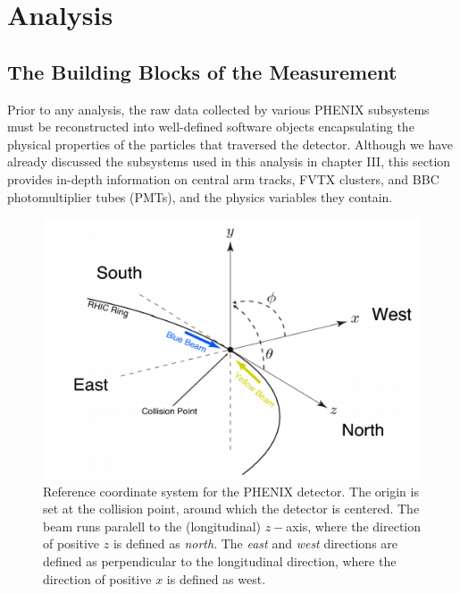 \chapter{Analysis}
\section{The Building Blocks of the Measurement}
Prior to any analysis, the raw data collected by various PHENIX subsystems must be reconstructed into well-defined software objects encapsulating the physical properties of the particles that traversed the detector. Although we have already discussed the subsystems used in this analysis in chapter III, this section provides in-depth information on central arm tracks, FVTX clusters, and BBC photomultiplier tubes (PMTs), and the physics variables they contain. 


\begin{figure}[!h]
\begin{center}
\includegraphics[width=0.55\linewidth]{figs/phenix_coord.png}
\caption{Reference coordinate system for the PHENIX detector. The origin is set at the collision point, around which the detector is centered. The beam runs paralell to the (longitudinal) $z-$axis, where the direction of positive $z$ is defined as \emph{north}. The \emph{east} and \emph{west} directions are defined as perpendicular to the longitudinal direction, where the direction of positive $x$ is defined as west.}
\end{center}
\end{figure}


